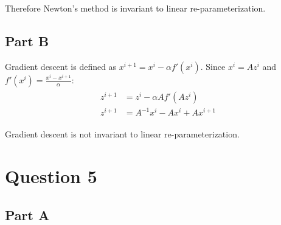 \documentclass[11pt]{article}
\begin{document}
Therefore Newton's method is invariant to linear re-parameterization. 

\subsection*{Part B}
Gradient descent is defined as $x^{i+1}=x^{i}-\alpha f'(x^{i})$. Since $x^{i}=Az^{i}$ and 
$f'(x^{i})=\frac{x^{i}-x^{i+1}}{\alpha}$:
\begin{align}
	\begin{split}
		z^{i+1} &= z^{i}-\alpha Af'(Az^{i}) \\
		z^{i+1} &= A^{-1}x^{i} - Ax^{i} + Ax^{i+1}
	\end{split}
\end{align}

Gradient descent is not invariant to linear re-parameterization.

\section*{Question 5}
\subsection*{Part A}
\end{document}
